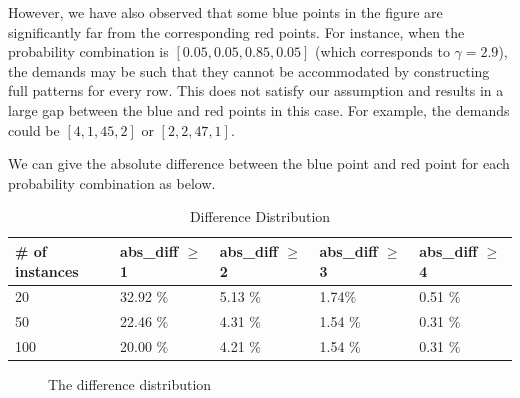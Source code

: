 However, we have also observed that some blue points in the figure are significantly far from the corresponding red points. For instance, when the probability combination is $[0.05, 0.05, 0.85, 0.05]$ (which corresponds to $\gamma = 2.9$), the demands may be such that they cannot be accommodated by constructing full patterns for every row. This does not satisfy our assumption and results in a large gap between the blue and red points in this case. For example, the demands could be $[4, 1, 45, 2]$ or $[2, 2, 47, 1]$.



We can give the absolute difference between the blue point and red point for each probability combination as below.

\begin{table}[ht]
  \centering
  \caption{Difference Distribution}
  \begin{tabular}{|l|l|l|l|l|}
  \hline
  \# of instances & abs\_diff $\geq$ 1 & abs\_diff $\geq$ 2 & abs\_diff $\geq$ 3 & abs\_diff $\geq$ 4 \\
  \hline
  20 & 32.92 \% & 5.13 \% & 1.74\% & 0.51 \% \\
  50 & 22.46 \% & 4.31 \% & 1.54 \% & 0.31 \%  \\
  100 & 20.00 \% & 4.21 \% & 1.54 \% & 0.31 \% \\
  \hline
  \end{tabular}
\end{table}


\begin{figure}[ht]
  \centering
  \caption{The difference distribution}
  \label{Fig}
\end{figure}

